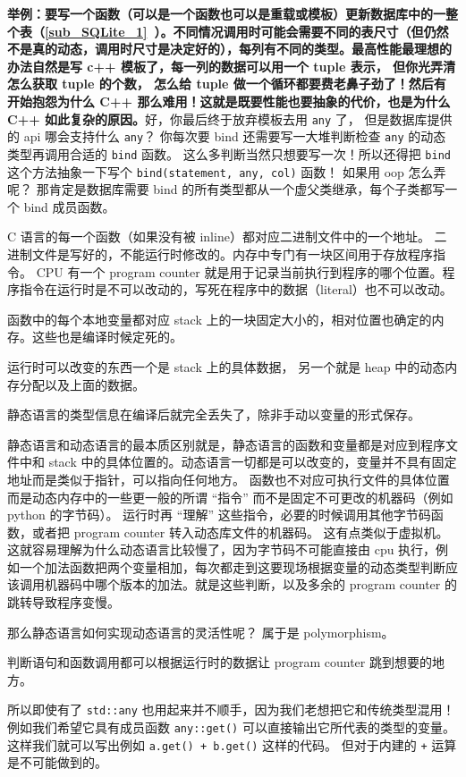 \textbf{举例：要写一个函数（可以是一个函数也可以是重载或模板）更新数据库中的一整个表（\autoref{sub_SQLite_1}~）。不同情况调用时可能会需要不同的表尺寸（但仍然不是真的动态，调用时尺寸是决定好的），每列有不同的类型。最高性能最理想的办法自然是写 c++ 模板了，每一列的数据可以用一个 tuple 表示， 但你光弄清怎么获取 tuple 的个数， 怎么给 tuple 做一个循环都要费老鼻子劲了！然后有开始抱怨为什么 C++ 那么难用！这就是既要性能也要抽象的代价，也是为什么 C++ 如此复杂的原因。}好，你最后终于放弃模板去用 \verb`any` 了， 但是数据库提供的 api 哪会支持什么 \verb`any`？ 你每次要 bind 还需要写一大堆判断检查 \verb`any` 的动态类型再调用合适的 \verb`bind` 函数。 这么多判断当然只想要写一次！所以还得把 \verb`bind` 这个方法抽象一下写个 \verb`bind(statement, any, col)` 函数！ 如果用 oop 怎么弄呢？ 那肯定是数据库需要 bind 的所有类型都从一个虚父类继承，每个子类都写一个 bind 成员函数。

C 语言的每一个函数（如果没有被 inline）都对应二进制文件中的一个地址。 二进制文件是写好的，不能运行时修改的。内存中专门有一块区间用于存放程序指令。 CPU 有一个 program counter 就是用于记录当前执行到程序的哪个位置。程序指令在运行时是不可以改动的，写死在程序中的数据（literal）也不可以改动。

函数中的每个本地变量都对应 stack 上的一块固定大小的，相对位置也确定的内存。这些也是编译时候定死的。

运行时可以改变的东西一个是 stack 上的具体数据， 另一个就是 heap 中的动态内存分配以及上面的数据。

静态语言的类型信息在编译后就完全丢失了，除非手动以变量的形式保存。

静态语言和动态语言的最本质区别就是，静态语言的函数和变量都是对应到程序文件中和 stack 中的具体位置的。动态语言一切都是可以改变的，变量并不具有固定地址而是类似于指针，可以指向任何地方。 函数也不对应可执行文件的具体位置而是动态内存中的一些更一般的所谓 “指令” 而不是固定不可更改的机器码（例如 python 的字节码）。 运行时再 “理解” 这些指令，必要的时候调用其他字节码函数，或者把 program counter 转入动态库文件的机器码。 这有点类似于虚拟机。 这就容易理解为什么动态语言比较慢了，因为字节码不可能直接由 cpu 执行，例如一个加法函数把两个变量相加，每次都走到这要现场根据变量的动态类型判断应该调用机器码中哪个版本的加法。就是这些判断，以及多余的 program counter 的跳转导致程序变慢。

那么静态语言如何实现动态语言的灵活性呢？ 属于是 polymorphism。

判断语句和函数调用都可以根据运行时的数据让 program counter 跳到想要的地方。

所以即使有了 \verb`std::any` 也用起来并不顺手，因为我们老想把它和传统类型混用！例如我们希望它具有成员函数 \verb`any::get()` 可以直接输出它所代表的类型的变量。 这样我们就可以写出例如 \verb`a.get() + b.get()` 这样的代码。 但对于内建的 \verb`+` 运算是不可能做到的。

